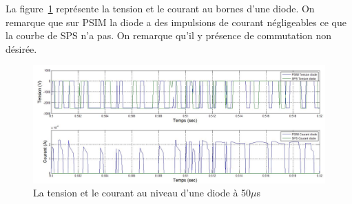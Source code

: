 \documentclass[11pt,letterpaper,final]{report}
\begin{document}
La figure~\ref{AF_3_DIODE50} représente la tension et le courant au bornes d'une diode. On remarque que sur PSIM la diode a des impulsions de courant négligeables ce que la courbe de SPS n'a pas. On remarque qu'il y présence de commutation non désirée.

\begin{figure}[htb]
\centering
\includegraphics[scale=0.5]{Fig/AFE3LEVEL/50u/DIODE.jpg}
\caption{La tension et le courant au niveau d'une diode à 50$\mu$s}
\label{AF_3_DIODE50}
\end{figure}

\clearpage
\end{document}

